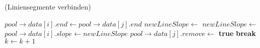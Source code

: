 \begin{algorithm}[!ht]
\caption{ (Liniensegmente verbinden)}
\label{alg:mergelines5}
\begin{algorithmic}[1]
		\State $\mathit{pool \to data}[i]\mathit{.end} \gets \mathit{pool \to data}[j]\mathit{.end}$
		\State $\mathit{newLineSlope} \gets$ 
		\State $\mathit{newLineSlope} \gets$ 
		\State $\mathit{pool \to data}[i]\mathit{.slope} \gets \mathit{newLineSlope}$
		\State $\mathit{pool \to data}[j]\mathit{.remove} \gets$ \textbf{true}
	\Else
		\State \textbf{break}
	\EndIf
	\State $k \gets k + 1$
	\EndFor
\end{algorithmic}
\end{algorithm}
